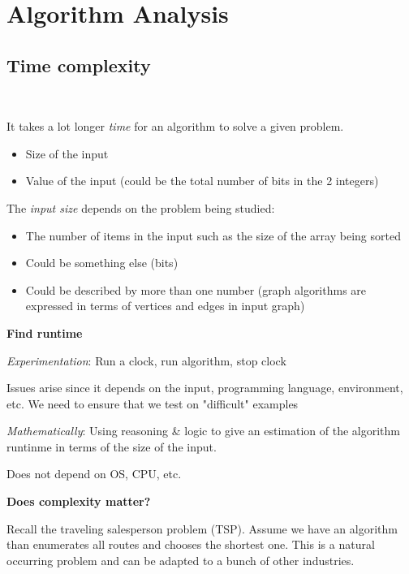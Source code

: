\section{Algorithm Analysis}
\subsection{Time complexity}\hfill\\
\par\bigskip
\noindent It takes a lot longer \textit{time} for an algorithm to solve a given problem.\par
\begin{itemize}
  \item Size of the input
  \item Value of the input (could be the total number of bits in the 2 integers)
\end{itemize}
\par\bigskip
\noindent The \textit{input size}  depends on the problem being studied:\par
\begin{itemize}
  \item The number of items in the input such as the size of the array being sorted
  \item Could be something else (bits)
  \item Could be described by more than one number (graph algorithms are expressed in terms of vertices and edges in input graph) 
\end{itemize}
\par\bigskip
\noindent\textbf{Find runtime}\par
\textit{Experimentation}: Run a clock, run algorithm, stop clock\par
Issues arise since it depends on the input, programming language, environment, etc. We need to ensure that we test on "difficult" examples
\par\bigskip
\textit{Mathematically}: Using reasoning \& logic to give an estimation of the algorithm runtinme in terms of the size of the input.\par
Does not depend on OS, CPU, etc. 
\par\bigskip
\textbf{Does complexity matter?}\par
\noindent Recall the traveling salesperson problem (TSP). Assume we have an algorithm than enumerates all routes and chooses the shortest one. This is a natural occurring problem and can be adapted to a bunch of other industries.
\par\bigskip
